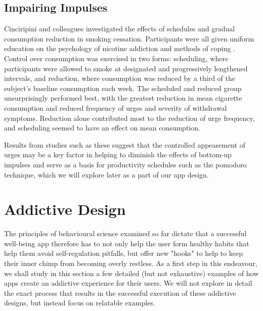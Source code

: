 \subsection{Impairing Impulses}
Cinciripini and colleagues investigated the effects of schedules and gradual consumption reduction in smoking cessation. Participants were all given uniform education on the psychology of nicotine addiction and methods of coping \cite{cinciripini1995effects}. Control over consumption was exercised in two forms: scheduling, where participants were allowed to smoke at designated and progressively lengthened intervals, and reduction, where consumption was reduced by a third of the subject's baseline consumption each week. The scheduled and reduced group unsurprisingly performed best, with the greatest reduction in mean cigarette consumption and reduced frequency of urges and severity of withdrawal symptoms. Reduction alone contributed most to the reduction of urge frequency, and scheduling seemed to have an effect on mean consumption.

Results from studies such as these suggest that the controlled appeasement of urges may be a key factor in helping to diminish the effects of bottom-up impulses and serve as a basis for productivity schedules such as the pomodoro technique, which we will explore later as a part of our app design.

\section{Addictive Design}
The principles of behavioural science examined so far dictate that a successful well-being app therefore has to not only help the user form healthy habits that help them avoid self-regulation pitfalls, but offer new "hooks" to help to keep their inner chimp from becoming overly restless. As a first step in this endeavour, we shall study in this section a few detailed (but not exhaustive) examples of how apps create an addictive experience for their users. We will not explore in detail the exact process that results in the successful execution of these addictive designs, but instead focus on relatable examples.

